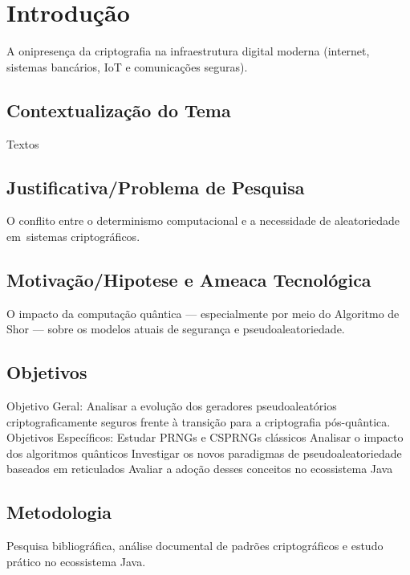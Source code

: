 \chapter{Introdução}

A onipresença da criptografia na infraestrutura digital moderna (internet, sistemas bancários, IoT e comunicações seguras).

\section{Contextualização do Tema}

Textos 

\section{Justificativa/Problema de Pesquisa}

O conflito entre o determinismo computacional e a necessidade de aleatoriedade em~sistemas criptográficos.

\section{Motivação/Hipotese e Ameaca Tecnológica}

O impacto da computação quântica --- especialmente por meio do Algoritmo de Shor --- sobre os modelos atuais de segurança e pseudoaleatoriedade.

\section{Objetivos}

Objetivo Geral: Analisar a evolução dos geradores pseudoaleatórios criptograficamente seguros frente à transição para a criptografia pós-quântica.
Objetivos Específicos:
Estudar PRNGs e CSPRNGs clássicos
Analisar o impacto dos algoritmos quânticos
Investigar os novos paradigmas de pseudoaleatoriedade baseados em reticulados
Avaliar a adoção desses conceitos no ecossistema Java


\section{Metodologia}

Pesquisa bibliográfica, análise documental de padrões criptográficos e estudo prático no ecossistema Java.